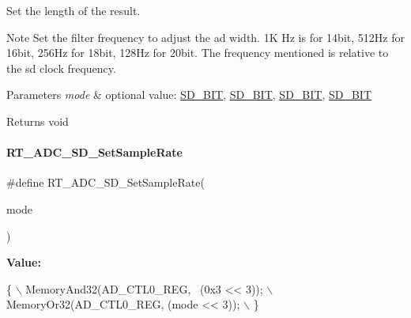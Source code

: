Set the length of the result. 

\begin{DoxyNote}{Note}
Set the filter frequency to adjust the ad width. 1K Hz is for 14bit, 512\+Hz for 16bit, 256\+Hz for 18bit, 128\+Hz for 20bit. The frequency mentioned is relative to the sd clock frequency. 
\end{DoxyNote}

\begin{DoxyParams}{Parameters}
{\em mode} & optional value\+: \mbox{\hyperlink{a00002_a44030e617a742aba101c6dcd3ec2078ea9c86002a4a99d0d440bca9b7f8d2ec93}{S\+D\+\_\+B\+IT}}, \mbox{\hyperlink{a00002_a44030e617a742aba101c6dcd3ec2078ea43562124882d2ecf1ce1b062c46e035c}{S\+D\+\_\+B\+IT}}, \mbox{\hyperlink{a00002_a44030e617a742aba101c6dcd3ec2078eacac5c6814a8f28e35ebeef99751a9d5f}{S\+D\+\_\+B\+IT}}, \mbox{\hyperlink{a00002_a44030e617a742aba101c6dcd3ec2078ea3a9f3242e2567dcfb29f566e45cf6de0}{S\+D\+\_\+B\+IT}} \\
\hline
\end{DoxyParams}
\begin{DoxyReturn}{Returns}
void 
\end{DoxyReturn}
\mbox{\label{a00002_a246ce987fa2b9f254f4796340eb23ed0}} 
\paragraph{\texorpdfstring{R\+T\+\_\+\+A\+D\+C\+\_\+\+S\+D\+\_\+\+Set\+Sample\+Rate}{RT\_ADC\_SD\_SetSampleRate}}
{\footnotesize\ttfamily \#define R\+T\+\_\+\+A\+D\+C\+\_\+\+S\+D\+\_\+\+Set\+Sample\+Rate(\begin{DoxyParamCaption}\item[{}]{mode }\end{DoxyParamCaption})}

{\bfseries Value\+:}
\begin{DoxyCode}
\{                                          \(\backslash\)
        MemoryAnd32(AD\_CTL0\_REG, ~(0x3 << 3)); \(\backslash\)
        MemoryOr32(AD\_CTL0\_REG, (mode << 3));  \(\backslash\)
    \}
\end{DoxyCode}



